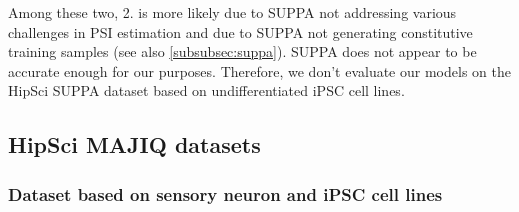 Among these two, 2. is more likely due to SUPPA not addressing various challenges in PSI estimation and due to SUPPA not generating constitutive training samples (see also \ref{subsubsec:suppa}). SUPPA does not appear to be accurate enough for our purposes. Therefore, we don't evaluate our models on the HipSci SUPPA dataset based on undifferentiated iPSC cell lines.





\subsection{HipSci MAJIQ datasets} \label{subsec:majiq}

\subsubsection{Dataset based on sensory neuron and iPSC cell lines}\label{sec:hipsci_neuron_majiq}

